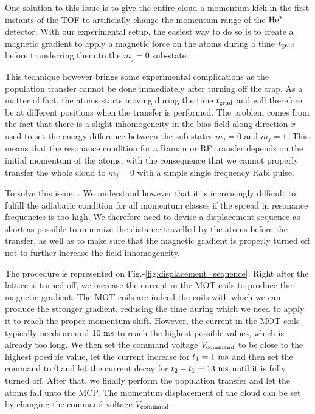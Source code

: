 One solution to this issue is to give the entire cloud a momentum kick in the first instants of the TOF to artificially change the momentum range of the $\mathrm{He}^*$ detector. With our experimental setup, the easiest way to do so is to create a magnetic gradient to apply a magnetic force on the atoms during a time $t_{\rm{grad}}$ before transferring them to the $m_j=0$ sub-state. 

This technique however brings some experimental complications as the population transfer cannot be done immediately after turning off the trap. As a matter of fact, the atoms starts moving during the time $t_{\rm{grad}}$ and will therefore be at different positions when the transfer is performed. The problem comes from the fact that there is a slight inhomogeneity in the bias field along direction $x$ used to set the energy difference between the sub-states $m_j=0$ and $m_j=1$. This means that the resonance condition for a Raman or RF transfer depends on the initial momentum of the atoms, with the consequence that we cannot properly transfer the whole cloud to $m_j=0$ with a simple single frequency Rabi pulse.

To solve this issue, . We understand however that it is increasingly difficult to fulfill the adiabatic condition for all momentum classes if the spread in resonance frequencies is too high. We therefore need to devise a displacement sequence as short as possible to minimize the distance travelled by the atoms before the transfer, as well as to make sure that the magnetic gradient is properly turned off not to further increase the field inhomogeneity.

The procedure is represented on Fig.-\ref{fig:displacement_sequence}. Right after the lattice is turned off, we increase the current in the MOT coils to produce the magnetic gradient. The MOT coils are indeed the coils with which we can produce the stronger gradient, reducing the time during which we need to apply it to reach the proper momentum shift. However, the current in the MOT coils typically needs around $10 \ \rm{ms}$ to reach the highest possible values, which is already too long. We then set the command voltage $V_{\rm{command}}$ to be close to the highest possible value, let the current increase for $t_1 = 1 \ \rm{ms}$ and then set the command to $0$ and let the current decay for $t_2-t_1=13 \ \rm{ms}$  until it is fully turned off. After that, we finally perform the population transfer and let the atoms fall unto the MCP. The momentum displacement of the cloud can be set by changing the command voltage $V_{\rm{command}}$.

